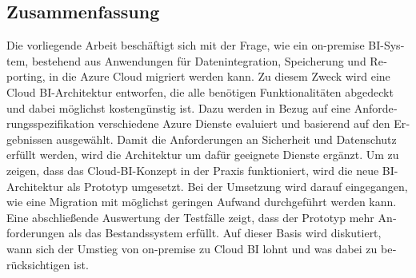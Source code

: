 \begin{otherlanguage}{ngerman}
	\chapter*{Zusammenfassung}
Die vorliegende Arbeit beschäftigt sich mit der Frage, wie ein on-premise BI-System, bestehend aus Anwendungen für Datenintegration, Speicherung und Reporting, in die Azure Cloud migriert werden kann. Zu diesem Zweck wird eine Cloud BI-Architektur entworfen, die alle benötigen Funktionalitäten abgedeckt und dabei möglichst kostengünstig ist. Dazu werden in Bezug auf eine Anforderungsspezifikation verschiedene Azure Dienste evaluiert und basierend auf den Ergebnissen ausgewählt. Damit die Anforderungen an Sicherheit und Datenschutz erfüllt werden, wird die Architektur um dafür geeignete Dienste ergänzt.
Um zu zeigen, dass das Cloud-BI-Konzept in der Praxis funktioniert, wird die neue BI-Architektur als Prototyp umgesetzt. Bei der Umsetzung wird darauf eingegangen, wie eine Migration mit möglichst geringen Aufwand durchgeführt werden kann. Eine abschließende Auswertung der Testfälle zeigt, dass der Prototyp mehr Anforderungen als das Bestandssystem erfüllt. Auf dieser Basis wird diskutiert, wann sich der Umstieg von on-premise zu Cloud BI lohnt und was dabei zu berücksichtigen ist.
\end{otherlanguage}